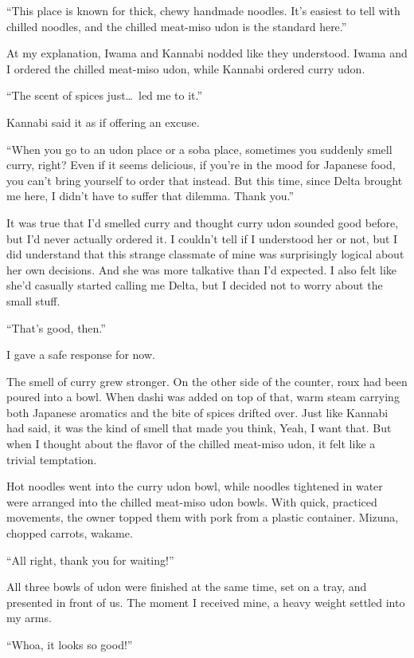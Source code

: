 \documentclass[
    a4paper,
    12pt,
    twoside,
    openany,
    UTF8,
    fontset=windows
]{ctexbook}
\begin{document}
``This place is known for thick, chewy handmade noodles. It's easiest to tell with chilled noodles, and the chilled meat-miso udon is the standard here.''

At my explanation, Iwama and Kannabi nodded like they understood. Iwama and I ordered the chilled meat-miso udon, while Kannabi ordered curry udon.

``The scent of spices just\dots\ led me to it.''

Kannabi said it as if offering an excuse.

``When you go to an udon place or a soba place, sometimes you suddenly smell curry, right? Even if it seems delicious, if you're in the mood for Japanese food, you can't bring yourself to order that instead. But this time, since Delta brought me here, I didn't have to suffer that dilemma. Thank you.''

It was true that I'd smelled curry and thought curry udon sounded good before, but I'd never actually ordered it. I couldn't tell if I understood her or not, but I did understand that this strange classmate of mine was surprisingly logical about her own decisions. And she was more talkative than I'd expected. I also felt like she'd casually started calling me Delta, but I decided not to worry about the small stuff.

``That's good, then.''

I gave a safe response for now.

The smell of curry grew stronger. On the other side of the counter, roux had been poured into a bowl. When dashi was added on top of that, warm steam carrying both Japanese aromatics and the bite of spices drifted over. Just like Kannabi had said, it was the kind of smell that made you think, Yeah, I want that. But when I thought about the flavor of the chilled meat-miso udon, it felt like a trivial temptation.

Hot noodles went into the curry udon bowl, while noodles tightened in water were arranged into the chilled meat-miso udon bowls. With quick, practiced movements, the owner topped them with pork from a plastic container. Mizuna, chopped carrots, wakame.

``All right, thank you for waiting!''

All three bowls of udon were finished at the same time, set on a tray, and presented in front of us. The moment I received mine, a heavy weight settled into my arms.

``Whoa, it looks so good!''
\end{document}
